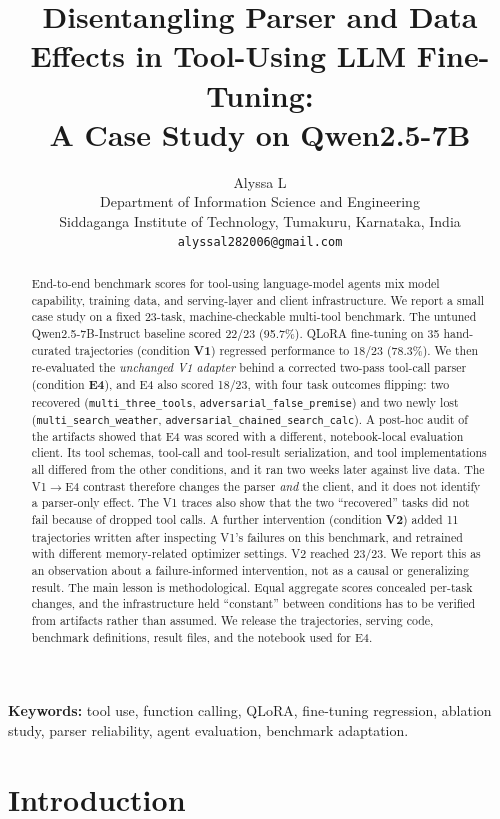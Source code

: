 \documentclass[10pt,twocolumn]{article}
\title{\bfseries Disentangling Parser and Data Effects in Tool-Using LLM Fine-Tuning:\\ A Case Study on Qwen2.5-7B}
\author{
  Alyssa L\\
  \small Department of Information Science and Engineering\\
  \small Siddaganga Institute of Technology, Tumakuru, Karnataka, India\\
  \small \texttt{alyssal282006@gmail.com}
}
\date{}
\newcommand{\code}[1]{\texttt{#1}}
\begin{document}
\maketitle

\begin{abstract}
\noindent
End-to-end benchmark scores for tool-using language-model agents mix model capability, training data, and serving-layer and client infrastructure. We report a small case study on a fixed 23-task, machine-checkable multi-tool benchmark. The untuned Qwen2.5-7B-Instruct baseline scored 22/23 (95.7\%). QLoRA fine-tuning on 35 hand-curated trajectories (condition \textbf{V1}) regressed performance to 18/23 (78.3\%). We then re-evaluated the \emph{unchanged V1 adapter} behind a corrected two-pass tool-call parser (condition \textbf{E4}), and E4 also scored 18/23, with four task outcomes flipping: two recovered (\code{multi\_three\_tools}, \code{adversarial\_false\_premise}) and two newly lost (\code{multi\_search\_weather}, \code{adversarial\_chained\_search\_calc}). A post-hoc audit of the artifacts showed that E4 was scored with a different, notebook-local evaluation client. Its tool schemas, tool-call and tool-result serialization, and tool implementations all differed from the other conditions, and it ran two weeks later against live data. The V1$\to$E4 contrast therefore changes the parser \emph{and} the client, and it does not identify a parser-only effect. The V1 traces also show that the two ``recovered'' tasks did not fail because of dropped tool calls. A further intervention (condition \textbf{V2}) added 11 trajectories written after inspecting V1's failures on this benchmark, and retrained with different memory-related optimizer settings. V2 reached 23/23. We report this as an observation about a failure-informed intervention, not as a causal or generalizing result. The main lesson is methodological. Equal aggregate scores concealed per-task changes, and the infrastructure held ``constant'' between conditions has to be verified from artifacts rather than assumed. We release the trajectories, serving code, benchmark definitions, result files, and the notebook used for E4.
\end{abstract}

\noindent\textbf{Keywords:} tool use, function calling, QLoRA, fine-tuning regression, ablation study, parser reliability, agent evaluation, benchmark adaptation.

\section{Introduction}
\end{document}
